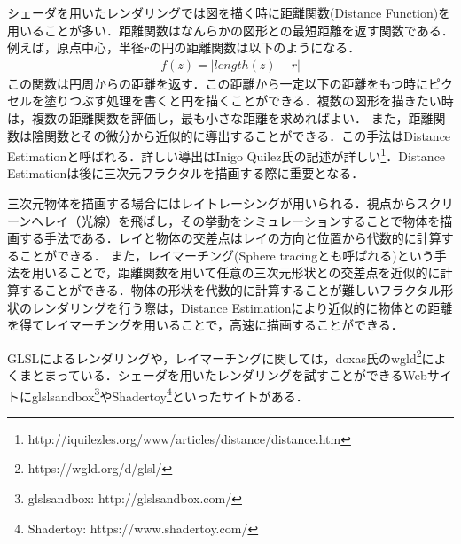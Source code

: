 シェーダを用いたレンダリングでは図を描く時に距離関数(Distance Function)を用いることが多い．距離関数はなんらかの図形との最短距離を返す関数である．例えば，原点中心，半径$r$の円の距離関数は以下のようになる．
\begin{eqnarray*}
 f(z) = | length(z) - r |
\end{eqnarray*}
この関数は円周からの距離を返す．この距離から一定以下の距離をもつ時にピクセルを塗りつぶす処理を書くと円を描くことができる．複数の図形を描きたい時は，複数の距離関数を評価し，最も小さな距離を求めればよい．
また，距離関数は陰関数とその微分から近似的に導出することができる．この手法はDistance Estimationと呼ばれる．詳しい導出はInigo Quilez氏の記述が詳しい\footnote{http://iquilezles.org/www/articles/distance/distance.htm}．Distance Estimationは後に三次元フラクタルを描画する際に重要となる．

三次元物体を描画する場合にはレイトレーシングが用いられる．視点からスクリーンへレイ（光線）を飛ばし，その挙動をシミュレーションすることで物体を描画する手法である．レイと物体の交差点はレイの方向と位置から代数的に計算することができる．
また，レイマーチング(Sphere tracingとも呼ばれる)\cite{sphereTracing}という手法を用いることで，距離関数を用いて任意の三次元形状との交差点を近似的に計算することができる．物体の形状を代数的に計算することが難しいフラクタル形状のレンダリングを行う際は，Distance Estimationにより近似的に物体との距離を得てレイマーチングを用いることで，高速に描画することができる．

GLSLによるレンダリングや，レイマーチングに関しては，doxas氏のwgld\footnote{https://wgld.org/d/glsl/}によくまとまっている．シェーダを用いたレンダリングを試すことができるWebサイトにglslsandbox\footnote{glslsandbox: http://glslsandbox.com/}やShadertoy\footnote{Shadertoy: https://www.shadertoy.com/}といったサイトがある．

